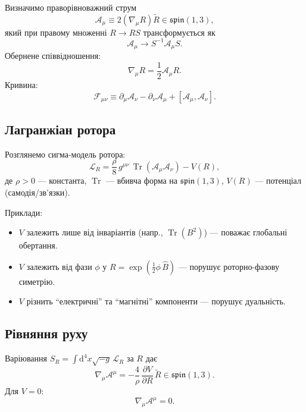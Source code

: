 \documentclass[11pt,a4paper]{article}
\numberwithin{equation}{section}
\theoremstyle{plain}
\theoremstyle{definition}
\theoremstyle{remark}
\DeclareMathOperator{\Tr}{Tr}
\newcommand{\dd}{\mathrm{d}}
\begin{document}
Визначимо праворівноважний струм
\begin{equation}
\mathcal{A}_\mu \equiv 2(\nabla_\mu R)\widetilde{R}\in \mathfrak{spin}(1,3),
\label{eq:MC}
\end{equation}
який при правому множенні $R\to RS$ трансформується як
\begin{equation}
\mathcal{A}_\mu \to S^{-1}\mathcal{A}_\mu S.
\end{equation}
Обернене співвідношення:
\begin{equation}
\nabla_\mu R = \frac{1}{2}\mathcal{A}_\mu R.
\label{eq:nabla-from-A}
\end{equation}
Кривина:
\begin{equation}
\mathcal{F}_{\mu\nu} \equiv \partial_\mu\mathcal{A}_\nu - \partial_\nu\mathcal{A}_\mu + [\mathcal{A}_\mu, \mathcal{A}_\nu].
\label{eq:field-strength}
\end{equation}

\subsection{Лагранжіан ротора}

Розглянемо сигма-модель ротора:
\begin{equation}
\mathcal{L}_R = \frac{\rho}{8}\, g^{\mu\nu}\,\Tr(\mathcal{A}_\mu\mathcal{A}_\nu) - V(R),
\label{eq:Lrot}
\end{equation}
де $\rho>0$ — константа, $\Tr$ — вбивча форма на $\mathfrak{spin}(1,3)$, $V(R)$ — потенціал (самодія/зв’язки).

Приклади:
\begin{itemize}
  \item $V$ залежить лише від інваріантів (напр., $\Tr(B^2)$) — поважає глобальні обертання.
  \item $V$ залежить від фази $\phi$ у $R=\exp(\frac{1}{2}\phi\,\hat{B})$ — порушує роторно-фазову симетрію.
  \item $V$ різнить “електричні” та “магнітні” компоненти — порушує дуальність.
\end{itemize}

\subsection{Рівняння руху}

Варіювання $S_R=\int \dd^4x \sqrt{-g}\,\mathcal{L}_R$ за $R$ дає
\begin{equation}
\nabla_\mu \mathcal{A}^\mu = -\frac{4}{\rho}\,\frac{\partial V}{\partial R}\,\widetilde{R} \in \mathfrak{spin}(1,3).
\label{eq:eom}
\end{equation}
Для $V=0$:
\begin{equation}
\nabla_\mu \mathcal{A}^\mu = 0.
\end{equation}
\end{document}
